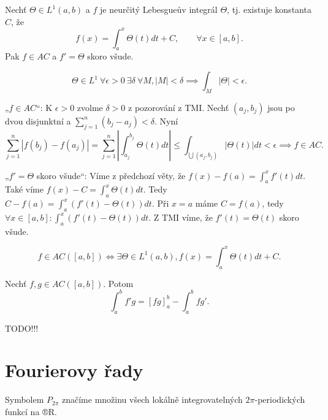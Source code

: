 \documentclass[12pt]{article}					%
\begin{document}
	\begin{veta}
		Nechť $\Theta \in L^1(a, b)$ a $f$ je neurčitý Lebesgueův integrál $\Theta$, tj. existuje konstanta $C$, že
		$$ f(x) = \int_a^x \Theta(t) dt + C, \qquad \forall x \in [a, b]. $$
		Pak $f \in AC$ a $f' = \Theta$ skoro všude.

		\begin{tvrzeni}
			$$ \Theta \in L^1\ \forall \epsilon > 0\ \exists \delta\ \forall M, |M| < \delta \implies \int_M |\Theta| < \epsilon. $$
		\end{tvrzeni}

		\begin{dukazin}
			„$f \in AC$“: K $\epsilon > 0$ zvolme $\delta > 0$ z pozorování z TMI. Nechť $(a_j, b_j)$ jsou po dvou disjunktní a $\sum_{j=1}^n (b_j - a_j) < \delta$. Nyní
			$$ \sum_{j=1}^n |f(b_j) - f(a_j)| = \sum_{j=1}^n |\int_{a_j}^{b_j} \Theta(t) dt| ≤ \int_{\bigcup (a_j, b_j)} |\Theta(t)| dt < \epsilon \implies f \in AC. $$

			„$f' = \Theta$ skoro všude“: Víme z předchozí věty, že $f(x) - f(a) = \int_a^x f'(t) dt$. Také víme $f(x) - C = \int_a^x \Theta(t) dt$. Tedy $C - f(a) = \int_a^x (f'(t) - \Theta(t)) dt$. Při $x = a$ máme $C = f(a)$, tedy $\forall x \in [a, b]: \int_a^x (f'(t) - \Theta(t)) dt$. Z TMI víme, že $f'(t) = \Theta(t)$ skoro všude.
		\end{dukazin}
	\end{veta}

	\begin{dusledek}
		$$ f \in AC ([a, b]) \Leftrightarrow \exists \Theta \in L^1(a, b), f(x) = \int_a^x \Theta(t) dt + C. $$
	\end{dusledek}


	\begin{veta}
		Nechť $f, g \in AC([a, b])$. Potom
		$$ \int_a^b f' g = [f g]_a^b - \int_a^b f g'. $$

		\begin{dukazin}
			TODO!!!
		\end{dukazin}
	\end{veta}

\section{Fourierovy řady}
	\begin{definice}
		Symbolem $P_{2\pi}$ značíme množinu všech lokálně integrovatelných $2\pi$-periodických funkcí na ®R.
	\end{definice}
\end{document}
